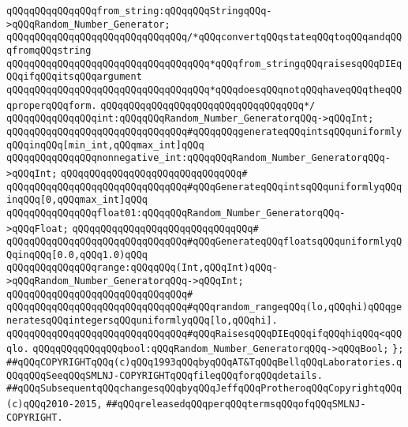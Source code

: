 \verb|qQQqqQQqqQQqqQQqfrom_string:qQQqqQQqStringqQQq->qQQqRandom_Number_Generator;|\newline
\verb|qQQqqQQqqQQqqQQqqQQqqQQqqQQqqQQq/*qQQqconvertqQQqstateqQQqtoqQQqandqQQqfromqQQqstring|\newline
\verb|qQQqqQQqqQQqqQQqqQQqqQQqqQQqqQQqqQQq*qQQqfrom_stringqQQqraisesqQQqDIEqQQqifqQQqitsqQQqargument|\newline
\verb|qQQqqQQqqQQqqQQqqQQqqQQqqQQqqQQqqQQq*qQQqdoesqQQqnotqQQqhaveqQQqtheqQQqproperqQQqform.|\newline
\verb|qQQqqQQqqQQqqQQqqQQqqQQqqQQqqQQqqQQq*/|\newline
\newline
\verb|qQQqqQQqqQQqqQQqint:qQQqqQQqRandom_Number_GeneratorqQQq->qQQqInt;|\newline
\verb|qQQqqQQqqQQqqQQqqQQqqQQqqQQqqQQq#qQQqqQQqgenerateqQQqintsqQQquniformlyqQQqinqQQq[min_int,qQQqmax_int]qQQq|\newline
\newline
\verb|qQQqqQQqqQQqqQQqnonnegative_int:qQQqqQQqRandom_Number_GeneratorqQQq->qQQqInt;|\newline
\verb|qQQqqQQqqQQqqQQqqQQqqQQqqQQqqQQq#|\newline
\verb|qQQqqQQqqQQqqQQqqQQqqQQqqQQqqQQq#qQQqGenerateqQQqintsqQQquniformlyqQQqinqQQq[0,qQQqmax_int]qQQq|\newline
\newline
\verb|qQQqqQQqqQQqqQQqfloat01:qQQqqQQqRandom_Number_GeneratorqQQq->qQQqFloat;|\newline
\verb|qQQqqQQqqQQqqQQqqQQqqQQqqQQqqQQq#|\newline
\verb|qQQqqQQqqQQqqQQqqQQqqQQqqQQqqQQq#qQQqGenerateqQQqfloatsqQQquniformlyqQQqinqQQq[0.0,qQQq1.0)qQQq|\newline
\newline
\verb|qQQqqQQqqQQqqQQqrange:qQQqqQQq(Int,qQQqInt)qQQq->qQQqRandom_Number_GeneratorqQQq->qQQqInt;|\newline
\verb|qQQqqQQqqQQqqQQqqQQqqQQqqQQqqQQq#|\newline
\verb|qQQqqQQqqQQqqQQqqQQqqQQqqQQqqQQq#qQQqrandom_rangeqQQq(lo,qQQqhi)qQQqgeneratesqQQqintegersqQQquniformlyqQQq[lo,qQQqhi].|\newline
\verb|qQQqqQQqqQQqqQQqqQQqqQQqqQQqqQQq#qQQqRaisesqQQqDIEqQQqifqQQqhiqQQq<qQQqlo.|\newline
\newline
\verb|qQQqqQQqqQQqqQQqbool:qQQqRandom_Number_GeneratorqQQq->qQQqBool;|\newline
\newline
\verb|};|\newline
\newline
\newline
\newline
\verb|##qQQqCOPYRIGHTqQQq(c)qQQq1993qQQqbyqQQqAT&TqQQqBellqQQqLaboratories.qQQqqQQqSeeqQQqSMLNJ-COPYRIGHTqQQqfileqQQqforqQQqdetails.|\newline
\verb|##qQQqSubsequentqQQqchangesqQQqbyqQQqJeffqQQqProtheroqQQqCopyrightqQQq(c)qQQq2010-2015,|\newline
\verb|##qQQqreleasedqQQqperqQQqtermsqQQqofqQQqSMLNJ-COPYRIGHT.|\newline

